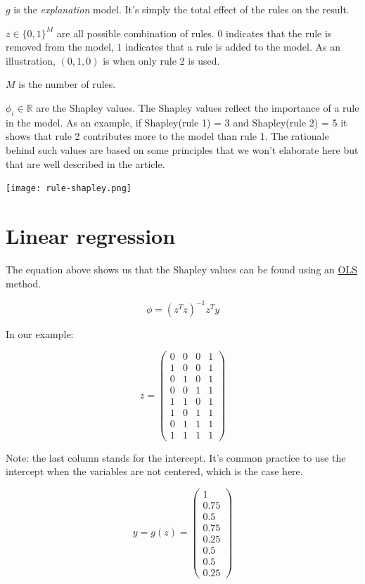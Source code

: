$g$ is the \textit{explanation} model. It's simply the total effect of the rules on the result.

$z \in \{0,1\}^M$ are all possible combination of rules. $0$ indicates that the rule is removed from the model, $1$ indicates that a rule is added to the model. As an illustration, $(0,1,0)$ is when only rule 2 is used.

$M$ is the number of rules. 

$\phi_i \in \mathbb{R}$ are the Shapley values. The Shapley values reflect the importance of a rule in the model. As an example, if Shapley(rule 1) = 3 and Shapley(rule 2) = 5 it shows that rule 2 contributes more to the model than rule 1. The rationale behind such values are based on some principles that we won't elaborate here but that are well described in the article. \\

\begin{center}
\texttt{[image: rule-shapley.png]}
\end{center}

\section{Linear regression}

\label{sec:linear-regression}

The equation above shows us that the Shapley values can be found using an \href{https://en.wikipedia.org/wiki/Ordinary_least_squares}{OLS} method.

$$\phi = (z^Tz)^{-1}z^Ty$$

In our example:

$$z = \begin{pmatrix}
0 & 0 & 0 & 1\\
1 & 0 & 0 & 1\\
0 & 1 & 0 & 1\\
0 & 0 & 1 & 1\\
1 & 1 & 0 & 1\\
1 & 0 & 1 & 1\\
0 & 1 & 1 & 1\\
1 & 1 & 1 & 1
\end{pmatrix}$$

Note: the last column stands for the intercept. It's common practice to use the intercept when the variables are not centered, which is the case here.

$$y = g(z) = \begin{pmatrix}
1 \\
0.75 \\
0.5 \\
0.75 \\
0.25 \\
0.5 \\
0.5 \\
0.25
\end{pmatrix}$$

